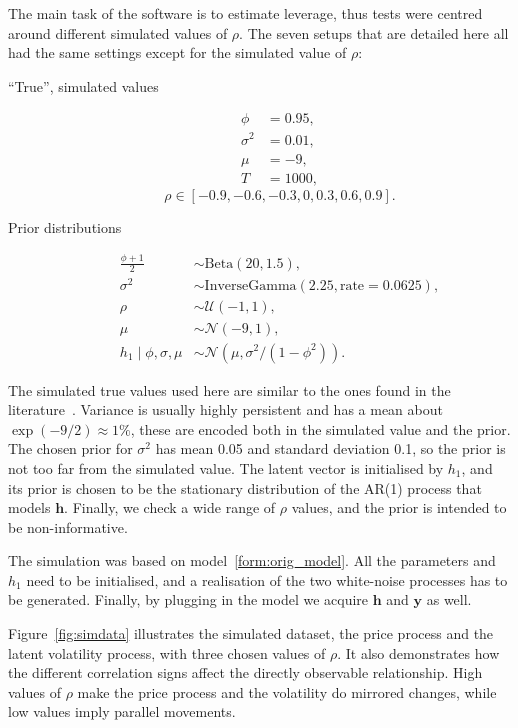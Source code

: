 The main task of the software is to estimate leverage, thus tests were centred around different simulated values of $\rho$.
The seven setups that are detailed here all had the same settings except for the simulated value of $\rho$:
\begin{description}
	\item[``True'', simulated values]
	\begin{align*}
	\phi &= 0.95, \\
	\sigma^2 &= 0.01, \\
	\mu &= -9, \\
	T &= 1000,
	\end{align*}
	\begin{equation*}
	\rho\in[-0.9,-0.6,-0.3,0,0.3,0.6,0.9].
	\end{equation*}
	\item[Prior distributions]
	\begin{align*}
	\frac{\phi+1}2 &\sim\text{Beta}(20,1.5), \\
	\sigma^2 &\sim\text{InverseGamma}(2.25,\text{rate}=0.0625), \\
	\rho &\sim\mathcal{U}(-1,1), \\
	\mu &\sim\mathcal{N}(-9,1), \\
	h_1\mid\phi,\sigma,\mu &\sim\mathcal{N}(\mu,\sigma^2/(1-\phi^2)).
	\end{align*}
\end{description}
The simulated true values used here are similar to the ones found in the literature~\citep{Omori2007,Kastner2014}.
Variance is usually highly persistent and has a mean about $\exp(-9/2)\approx 1\%$, these are encoded both in the simulated value and the prior.
The chosen prior for $\sigma^2$ has mean 0.05 and standard deviation 0.1, so the prior is not too far from the simulated value.
The latent vector is initialised by $h_1$, and its prior is chosen to be the stationary distribution of the AR(1) process that models $\bm h$.
Finally, we check a wide range of $\rho$ values, and the prior is intended to be non-informative.

The simulation was based on model~\eqref{form:orig_model}.
All the parameters and $h_1$ need to be initialised, and a realisation of the two white-noise processes has to be generated.
Finally, by plugging in the model we acquire $\bm h$ and $\bm y$ as well.

Figure~\ref{fig:simdata} illustrates the simulated dataset, the price process and the latent volatility process, with three chosen values of $\rho$.
It also demonstrates how the different correlation signs affect the directly observable relationship.
High values of $\rho$ make the price process and the volatility do mirrored changes, while low values imply parallel movements.

